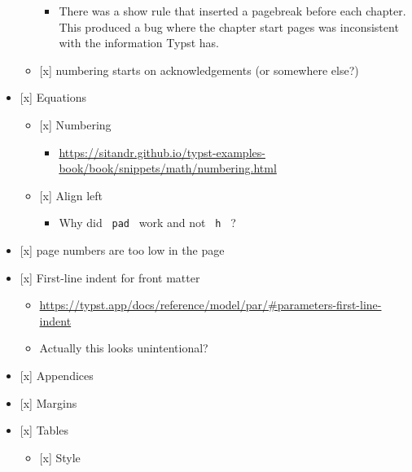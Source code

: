 \begin{itemize}
\begin{itemize}
    \begin{itemize}
    \tightlist
    \item
      There was a show rule that inserted a pagebreak before each
      chapter. This produced a bug where the chapter start pages was
      inconsistent with the information Typst has.
    \end{itemize}
  \item
    {[}x{]} numbering starts on acknowledgements (or somewhere else?)
  \end{itemize}
\item
  {[}x{]} Equations

  \begin{itemize}
  \tightlist
  \item
    {[}x{]} Numbering

    \begin{itemize}
    \tightlist
    \item
      \url{https://sitandr.github.io/typst-examples-book/book/snippets/math/numbering.html}
    \end{itemize}
  \item
    {[}x{]} Align left

    \begin{itemize}
    \tightlist
    \item
      Why did \texttt{\ pad\ } work and not \texttt{\ h\ } ?
    \end{itemize}
  \end{itemize}
\item
  {[}x{]} page numbers are too low in the page
\item
  {[}x{]} First-line indent for front matter

  \begin{itemize}
  \tightlist
  \item
    \url{https://typst.app/docs/reference/model/par/\#parameters-first-line-indent}
  \item
    Actually this looks unintentional?
  \end{itemize}
\item
  {[}x{]} Appendices
\item
  {[}x{]} Margins
\item
  {[}x{]} Tables

  \begin{itemize}
  \tightlist
  \item
    {[}x{]} Style
  \end{itemize}
\end{itemize}

